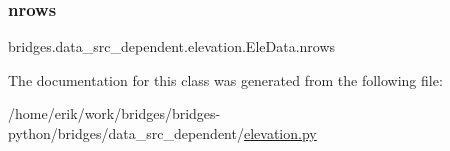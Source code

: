 \mbox{\label{classbridges_1_1data__src__dependent_1_1elevation_1_1_ele_data_a9451760998220fcc4e214842fa5a5f65}} 
\subsubsection{\texorpdfstring{nrows}{nrows}}
{\footnotesize\ttfamily bridges.\+data\+\_\+src\+\_\+dependent.\+elevation.\+Ele\+Data.\+nrows}



The documentation for this class was generated from the following file\+:\begin{DoxyCompactItemize}
\item 
/home/erik/work/bridges/bridges-\/python/bridges/data\+\_\+src\+\_\+dependent/\hyperlink{elevation_8py}{elevation.\+py}\end{DoxyCompactItemize}

